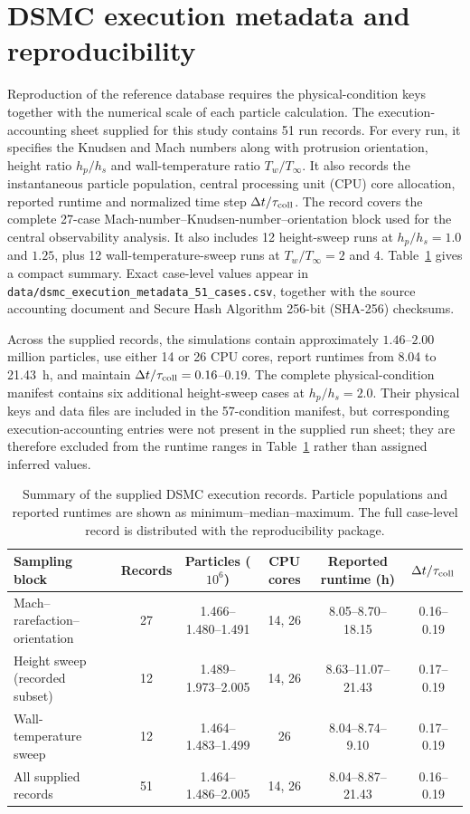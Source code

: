 \documentclass[aip,pof,preprint,notitlepage,floatfix,amsmath,amssymb]{revtex4-2}
\begin{document}
\clearpage
\appendix
\section{DSMC execution metadata and reproducibility}
\label{app:dsmc_execution}
Reproduction of the reference database requires the physical-condition keys together with the numerical scale of each particle calculation. The execution-accounting sheet supplied for this study contains 51 run records. For every run, it specifies the Knudsen and Mach numbers along with protrusion orientation, height ratio $h_p/h_s$ and wall-temperature ratio $T_w/T_\infty$. It also records the instantaneous particle population, central processing unit (CPU) core allocation, reported runtime and normalized time step $\Delta t/\tau_{\rm coll}$. The record covers the complete 27-case Mach-number--Knudsen-number--orientation block used for the central observability analysis. It also includes 12 height-sweep runs at $h_p/h_s=1.0$ and $1.25$, plus 12 wall-temperature-sweep runs at $T_w/T_\infty=2$ and $4$. Table~\ref{tab:dsmc_execution} gives a compact summary. Exact case-level values appear in \texttt{data/dsmc\_execution\_metadata\_51\_cases.csv}, together with the source accounting document and Secure Hash Algorithm 256-bit (SHA-256) checksums.

Across the supplied records, the simulations contain approximately $1.46$--$2.00$ million particles, use either 14 or 26 CPU cores, report runtimes from 8.04 to 21.43~h, and maintain $\Delta t/\tau_{\rm coll}=0.16$--$0.19$. The complete physical-condition manifest contains six additional height-sweep cases at $h_p/h_s=2.0$. Their physical keys and data files are included in the 57-condition manifest, but corresponding execution-accounting entries were not present in the supplied run sheet; they are therefore excluded from the runtime ranges in Table~\ref{tab:dsmc_execution} rather than assigned inferred values.

\begin{table}[h]
\centering
\caption{Summary of the supplied DSMC execution records. Particle populations and reported runtimes are shown as minimum--median--maximum. The full case-level record is distributed with the reproducibility package.}
\label{tab:dsmc_execution}
\scriptsize
\setlength{\tabcolsep}{4pt}
\begin{tabular}{lccccc}
\toprule
Sampling block & Records & Particles ($10^6$) & CPU cores & Reported runtime (h) & $\Delta t/\tau_{\rm coll}$ \\
\midrule
Mach--rarefaction--orientation & 27 & 1.466--1.480--1.491 & 14, 26 & 8.05--8.70--18.15 & 0.16--0.19 \\
Height sweep (recorded subset) & 12 & 1.489--1.973--2.005 & 14, 26 & 8.63--11.07--21.43 & 0.17--0.19 \\
Wall-temperature sweep & 12 & 1.464--1.483--1.499 & 26 & 8.04--8.74--9.10 & 0.17--0.19 \\
\midrule
All supplied records & 51 & 1.464--1.486--2.005 & 14, 26 & 8.04--8.87--21.43 & 0.16--0.19 \\
\bottomrule
\end{tabular}
\end{table}
\end{document}
